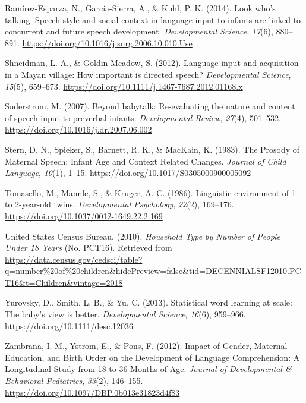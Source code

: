 \documentclass[
  man,floatsintext]{apa6}
\newlength{\cslhangindent}
\newlength{\cslentryspacingunit} %
\newenvironment{CSLReferences}[2] %
 {%
  \setlength{\parindent}{0pt}
  \ifodd #1
  \let\oldpar\par
  \def\par{\hangindent=\cslhangindent\oldpar}
  \fi
  \setlength{\parskip}{#2\cslentryspacingunit}
 }%
 {}
\begin{document}
\begin{CSLReferences}{1}{0}
\leavevmode{}%
Ramírez-Esparza, N., García-Sierra, A., \& Kuhl, P. K. (2014). Look who's talking: Speech style and social context in language input to infants are linked to concurrent and future speech development. \emph{Developmental Science}, \emph{17}(6), 880--891. \url{https://doi.org/10.1016/j.surg.2006.10.010.Use}

\leavevmode{}%
Shneidman, L. A., \& Goldin‐Meadow, S. (2012). Language input and acquisition in a {Mayan} village: How important is directed speech? \emph{Developmental Science}, \emph{15}(5), 659--673. \url{https://doi.org/10.1111/j.1467-7687.2012.01168.x}

\leavevmode{}%
Soderstrom, M. (2007). Beyond babytalk: {Re}-evaluating the nature and content of speech input to preverbal infants. \emph{Developmental Review}, \emph{27}(4), 501--532. \url{https://doi.org/10.1016/j.dr.2007.06.002}

\leavevmode{}%
Stern, D. N., Spieker, S., Barnett, R. K., \& MacKain, K. (1983). The {Prosody} of {Maternal} {Speech}: {Infant} {Age} and {Context} {Related} {Changes}. \emph{Journal of Child Language}, \emph{10}(1), 1--15. \url{https://doi.org/10.1017/S0305000900005092}

\leavevmode{}%
Tomasello, M., Mannle, S., \& Kruger, A. C. (1986). Linguistic environment of 1- to 2-year-old twins. \emph{Developmental Psychology}, \emph{22}(2), 169--176. \url{https://doi.org/10.1037/0012-1649.22.2.169}

\leavevmode{}%
United States Census Bureau. (2010). \emph{Household {Type} by {Number} of {People} {Under} 18 {Years}} (No. PCT16). Retrieved from \url{https://data.census.gov/cedsci/table?q=number\%20of\%20children\&hidePreview=false\&tid=DECENNIALSF12010.PCT16\&t=Children\&vintage=2018}

\leavevmode{}%
Yurovsky, D., Smith, L. B., \& Yu, C. (2013). Statistical word learning at scale: The baby's view is better. \emph{Developmental Science}, \emph{16}(6), 959--966. \url{https://doi.org/10.1111/desc.12036}

\leavevmode{}%
Zambrana, I. M., Ystrom, E., \& Pons, F. (2012). Impact of {Gender}, {Maternal} {Education}, and {Birth} {Order} on the {Development} of {Language} {Comprehension}: {A} {Longitudinal} {Study} from 18 to 36 {Months} of {Age}. \emph{Journal of Developmental \& Behavioral Pediatrics}, \emph{33}(2), 146--155. \url{https://doi.org/10.1097/DBP.0b013e31823d4f83}

\end{CSLReferences}

\endgroup
\end{document}
